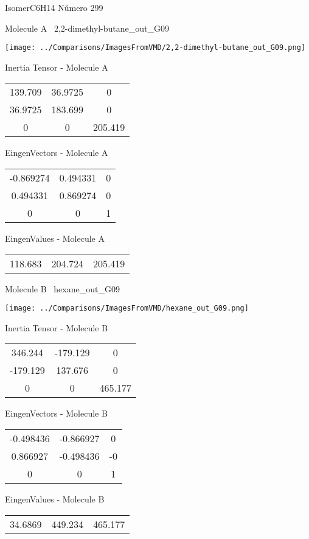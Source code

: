 \vtab[-3cm]
\begin{center}
{\large IsomerC6H14 \tab Número 299}
\end{center}
\begin{multicols}{2}
\begin{center}

Molecule A \
2,2-dimethyl-butane\_out\_G09

\texttt{[image: ../Comparisons/ImagesFromVMD/2,2-dimethyl-butane\_out\_G09.png]}

Inertia Tensor - Molecule A \\
\begin{tabular}{|c c c|}
139.709	 & 	36.9725	 & 	0	 \\
36.9725	 & 	183.699	 & 	0	 \\
0	 & 	0	 & 	205.419
\end{tabular}

\vtab
 EingenVectors - Molecule A     \\
\begin{tabular}{|c c c|}
-0.869274	 & 	0.494331	 & 	0	 \\
0.494331	 & 	0.869274	 & 	0	 \\
0	 & 	0	 & 	1
\end{tabular}

\vtab
 EingenValues - Molecule A     \\
\begin{tabular}{|c c c|}
118.683	 & 	204.724	 & 	205.419	 \\
\end{tabular}
\columnbreak

Molecule B \
hexane\_out\_G09

\texttt{[image: ../Comparisons/ImagesFromVMD/hexane\_out\_G09.png]}

Inertia Tensor - Molecule B \\
\begin{tabular}{|c c c|}
346.244	 & 	-179.129	 & 	0	 \\
-179.129	 & 	137.676	 & 	0	 \\
0	 & 	0	 & 	465.177
\end{tabular}

\vtab
 EingenVectors - Molecule B     \\
\begin{tabular}{|c c c|}
-0.498436	 & 	-0.866927	 & 	0	 \\
0.866927	 & 	-0.498436	 & 	-0	 \\
0	 & 	0	 & 	1
\end{tabular}

\vtab
 EingenValues - Molecule B     \\
\begin{tabular}{|c c c|}
34.6869	 & 	449.234	 & 	465.177	 \\
\end{tabular}

\end{center}
\end{multicols}

